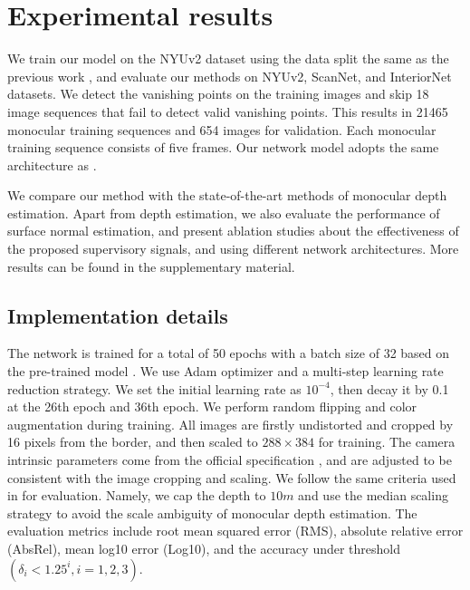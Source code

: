 \documentclass[10pt,twocolumn,letterpaper]{article}
\begin{document}
\section{Experimental results}


We train our model on the NYUv2 dataset \cite{silberman2012indoor} using the data split the same as the previous work \cite{zhou2019moving}\cite{yu2020p}, and evaluate our methods on NYUv2\cite{silberman2012indoor}, ScanNet\cite{dai2017scannet}, and InteriorNet\cite{li2018interiornet} datasets.  We detect the vanishing points on the training images and skip 18 image sequences that fail to detect valid vanishing points. This results in 21465 monocular training sequences and 654 images for validation. Each monocular training sequence consists of five frames. Our network model adopts the same architecture as \cite{yu2020p}.

We compare our method with the state-of-the-art methods of monocular depth estimation. Apart from depth estimation, we also evaluate the performance of surface normal estimation, and present ablation studies about the effectiveness of the proposed supervisory signals, and using different network architectures. More results can be found in the supplementary material.

\subsection{Implementation details}
The network is trained for a total of 50 epochs with a batch size of 32 based on the pre-trained model \cite{yu2020p}. We use Adam optimizer and a multi-step learning rate reduction strategy. We set the initial learning rate as $10^{-4}$, then decay it by 0.1 at the 26th epoch and 36th epoch. We perform random flipping and color augmentation during training. All images are firstly undistorted and cropped by 16 pixels from the border, and then scaled to $288\times384$ for training. The camera intrinsic parameters come from the official specification \cite{silberman2012indoor}, and are adjusted to be consistent with the image cropping and scaling. We follow the same criteria used in \cite{godard2019digging,yu2020p}  for evaluation. Namely, we cap the depth to $10m$  and use the median scaling strategy to avoid the scale ambiguity of monocular depth estimation. The evaluation metrics include root mean squared error (RMS), absolute relative error (AbsRel), mean log10 error (Log10), and the accuracy under threshold $(\delta_i < 1.25^i, i = 1, 2, 3)$.
\end{document}

